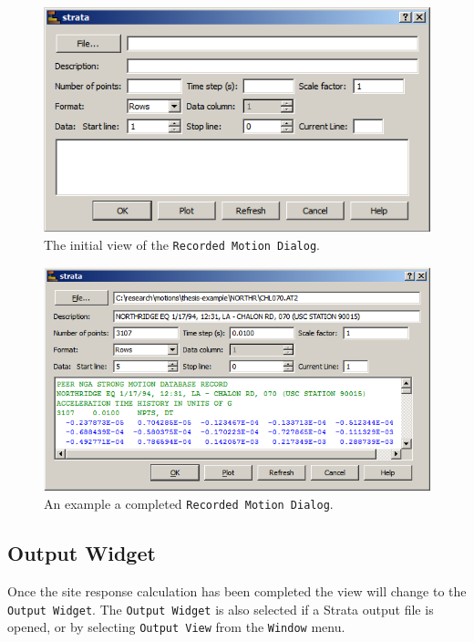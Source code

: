 \documentclass[12pt,oneside]{book}
\begin{document}
\begin{figure}
    \begin{center}
        \includegraphics[scale=0.65]{figures/strata/recordedMotionDialog.png}
    \end{center}
    \caption{The initial view of the \texttt{Recorded Motion Dialog}.}
    \label{fig:strata:recordedMotionDialog}
\end{figure}

\begin{figure}
    \begin{center}
        \includegraphics[scale=0.65]{figures/strata/recordedMotionDialogExample.png}
    \end{center}
    \caption{An example a completed \texttt{Recorded Motion Dialog}.}
    \label{fig:strata:recordedMotionDialogExample}
\end{figure}

\clearpage
\subsection{Output Widget}\label{ch:strata:particulars:outputWidget}
Once the site response calculation has been completed the view will change to the \texttt{Output
Widget}.  The \texttt{Output Widget} is also selected if a Strata output file is opened, or by
selecting \texttt{Output View} from the \texttt{Window} menu.  
\end{document}
